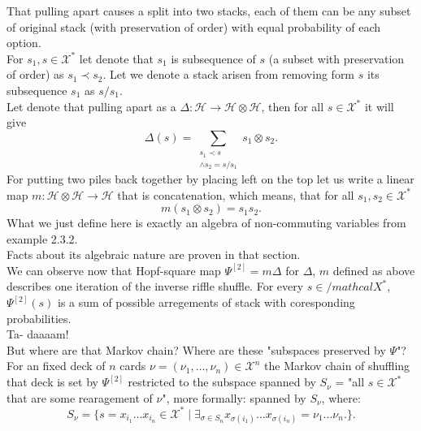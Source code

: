 \documentclass[a4paper, 12pt]{report}
\begin{document}
That pulling apart causes a split into two stacks, each of them can be any subset of original stack 
(with preservation of order) with equal probability of each option. \\
For $s_1, s \in \mathcal{X}^*$ let denote that $s_1$ is subsequence of $s$ (a subset with preservation of 
order) as $s_1 \prec s_2$. Let we denote a stack arisen from removing form $s$ its subsequence $s_1$ as 
$s/s_1$. \\
Let denote that pulling apart as a $\Delta : \mathcal{H} \to \mathcal{H} \otimes \mathcal{H}$, then for all 
$s \in \mathcal{X}^*$ it will give
\begin{equation*}
\Delta(s) = \sum_{\substack{s_1 \prec s \\ \land s_2 = s/s_1}}
s_1 \otimes s_2.
\end{equation*}
For putting two piles back together by placing left on the top let us write a linear map 
$m : \mathcal{H} \otimes \mathcal{H} \to \mathcal{H}$ that is concatenation, which means, that 
for all $s_1, s_2 \in \mathcal{X}^*$
\begin{equation*}
m(s_1 \otimes s_2) = s_1s_2.
\end{equation*}
What we just define here is exactly an algebra of non-commuting variables from example 
2.3.2.\\
Facts about its algebraic nature are proven in that section. \\
We can observe now that Hopf-square map $\Psi^{[2]} = m\Delta$ for $\Delta$, $m$ defined as above 
describes one iteration of the inverse riffle shuffle. For every $s \in /mathcal{X}^*$, $\Psi^{[2]}(s)$ is 
a sum of possible arregements of stack with coresponding probabilities. \\ Ta- daaaam! \\[4pt]
But where are that Markov chain? Where are these "subspaces preserved by $\Psi$"? \\
For an fixed deck of $n$ cards $\nu = (\nu_1, \dots, \nu_n) \in \mathcal{X}^n$ the Markov chain of shuffling 
that deck is set by $\Psi^{[2]}$ restricted to the subspace spanned by $S_\nu$ = "all $s \in \mathcal{X}^*$ 
that are some rearagement of $\nu$", more formally: spanned by $S_\nu$, where:
\begin{equation*}
S_\nu = \{ s = x_{i_1}\dots x_{i_n} \in \mathcal{X}^* \mid
\exists_{\sigma \in S_n} x_{\sigma(i_1)}\dots x_{\sigma(i_n)} = \nu_1\dots \nu_n. \}.
\end{equation*}
\end{document}
